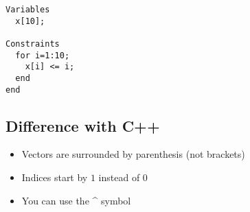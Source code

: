 \begin{verbatim}
Variables
  x[10];

Constraints
  for i=1:10;
    x[i] <= i;
  end
end
\end{verbatim}

\subsection{Difference with C++}

\begin{itemize}
\item Vectors are surrounded by parenthesis (not brackets)
\item Indices start by $1$ instead of $0$
\item You can use the \^{} symbol
\end{itemize}

